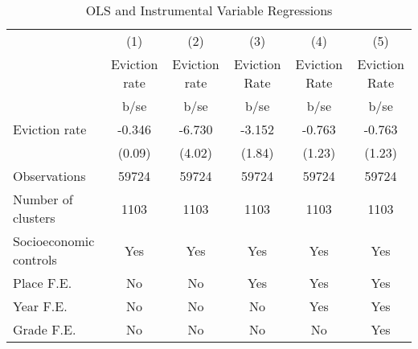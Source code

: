 \begin{table}[htbp]\centering
\def\sym#1{\ifmmode^{#1}\else\(^{#1}\)\fi}
\caption{OLS and Instrumental Variable Regressions}
\begin{tabular}{l*{5}{c}}
\hline\hline
                    &\multicolumn{1}{c}{(1)}&\multicolumn{1}{c}{(2)}&\multicolumn{1}{c}{(3)}&\multicolumn{1}{c}{(4)}&\multicolumn{1}{c}{(5)}\\
                    &Eviction rate&Eviction rate&Eviction Rate&Eviction Rate&Eviction Rate\\
                    &        b/se&        b/se&        b/se&        b/se&        b/se\\
\hline
Eviction rate       &      -0.346&      -6.730&      -3.152&      -0.763&      -0.763\\
                    &      (0.09)&      (4.02)&      (1.84)&      (1.23)&      (1.23)\\
\hline
Observations        &       59724&       59724&       59724&       59724&       59724\\
Number of clusters  &        1103&        1103&        1103&        1103&        1103\\
Socioeconomic controls&         Yes&         Yes&         Yes&         Yes&         Yes\\
Place F.E.          &          No&          No&         Yes&         Yes&         Yes\\
Year F.E.           &          No&          No&          No&         Yes&         Yes\\
Grade F.E.          &          No&          No&          No&          No&         Yes\\
\hline\hline
\end{tabular}
\end{table}
